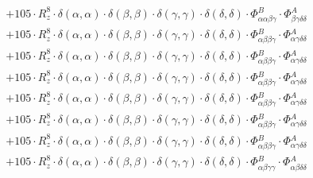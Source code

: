 \documentclass{article}
\begin{document}
\begin{subequations}
\begin{gather}
\begin{array}{c}
 \\[0.2em] 		 + 105 \cdot R_{z}^{8} \cdot \delta{}\left(\alpha{}, \alpha{}\right) \cdot \delta{}\left(\beta{}, \beta{}\right) \cdot \delta{}\left(\gamma{}, \gamma{}\right) \cdot \delta{}\left(\delta{}, \delta{}\right) \cdot \Phi{}^{B}_{\alpha{}\alpha{}\beta{}\gamma{}} \cdot \Phi{}^{A}_{\beta{}\gamma{}\delta{}\delta{}} 
 \\[0.2em] 		 + 105 \cdot R_{z}^{8} \cdot \delta{}\left(\alpha{}, \alpha{}\right) \cdot \delta{}\left(\beta{}, \beta{}\right) \cdot \delta{}\left(\gamma{}, \gamma{}\right) \cdot \delta{}\left(\delta{}, \delta{}\right) \cdot \Phi{}^{B}_{\alpha{}\beta{}\beta{}\gamma{}} \cdot \Phi{}^{A}_{\alpha{}\gamma{}\delta{}\delta{}} 
 \\[0.2em] 		 + 105 \cdot R_{z}^{8} \cdot \delta{}\left(\alpha{}, \alpha{}\right) \cdot \delta{}\left(\beta{}, \beta{}\right) \cdot \delta{}\left(\gamma{}, \gamma{}\right) \cdot \delta{}\left(\delta{}, \delta{}\right) \cdot \Phi{}^{B}_{\alpha{}\beta{}\beta{}\gamma{}} \cdot \Phi{}^{A}_{\alpha{}\gamma{}\delta{}\delta{}} 
 \\[0.2em] 		 + 105 \cdot R_{z}^{8} \cdot \delta{}\left(\alpha{}, \alpha{}\right) \cdot \delta{}\left(\beta{}, \beta{}\right) \cdot \delta{}\left(\gamma{}, \gamma{}\right) \cdot \delta{}\left(\delta{}, \delta{}\right) \cdot \Phi{}^{B}_{\alpha{}\beta{}\beta{}\gamma{}} \cdot \Phi{}^{A}_{\alpha{}\gamma{}\delta{}\delta{}} 
 \\[0.2em] 		 + 105 \cdot R_{z}^{8} \cdot \delta{}\left(\alpha{}, \alpha{}\right) \cdot \delta{}\left(\beta{}, \beta{}\right) \cdot \delta{}\left(\gamma{}, \gamma{}\right) \cdot \delta{}\left(\delta{}, \delta{}\right) \cdot \Phi{}^{B}_{\alpha{}\beta{}\beta{}\gamma{}} \cdot \Phi{}^{A}_{\alpha{}\gamma{}\delta{}\delta{}} 
 \\[0.2em] 		 + 105 \cdot R_{z}^{8} \cdot \delta{}\left(\alpha{}, \alpha{}\right) \cdot \delta{}\left(\beta{}, \beta{}\right) \cdot \delta{}\left(\gamma{}, \gamma{}\right) \cdot \delta{}\left(\delta{}, \delta{}\right) \cdot \Phi{}^{B}_{\alpha{}\beta{}\beta{}\gamma{}} \cdot \Phi{}^{A}_{\alpha{}\gamma{}\delta{}\delta{}} 
 \\[0.2em] 		 + 105 \cdot R_{z}^{8} \cdot \delta{}\left(\alpha{}, \alpha{}\right) \cdot \delta{}\left(\beta{}, \beta{}\right) \cdot \delta{}\left(\gamma{}, \gamma{}\right) \cdot \delta{}\left(\delta{}, \delta{}\right) \cdot \Phi{}^{B}_{\alpha{}\beta{}\beta{}\gamma{}} \cdot \Phi{}^{A}_{\alpha{}\gamma{}\delta{}\delta{}} 
 \\[0.2em] 		 + 105 \cdot R_{z}^{8} \cdot \delta{}\left(\alpha{}, \alpha{}\right) \cdot \delta{}\left(\beta{}, \beta{}\right) \cdot \delta{}\left(\gamma{}, \gamma{}\right) \cdot \delta{}\left(\delta{}, \delta{}\right) \cdot \Phi{}^{B}_{\alpha{}\beta{}\gamma{}\gamma{}} \cdot \Phi{}^{A}_{\alpha{}\beta{}\delta{}\delta{}} 

\end{array}
\end{gather}
\end{subequations}
\end{document}
